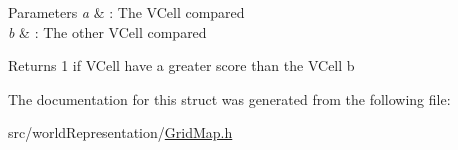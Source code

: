 \begin{DoxyParams}{Parameters}
{\em a} & \+: The V\+Cell compared \\
\hline
{\em b} & \+: The other V\+Cell compared \\
\hline
\end{DoxyParams}
\begin{DoxyReturn}{Returns}
1 if V\+Cell have a greater score than the V\+Cell b 
\end{DoxyReturn}


The documentation for this struct was generated from the following file\+:\begin{DoxyCompactItemize}
\item 
src/world\+Representation/\hyperlink{GridMap_8h}{Grid\+Map.\+h}\end{DoxyCompactItemize}
